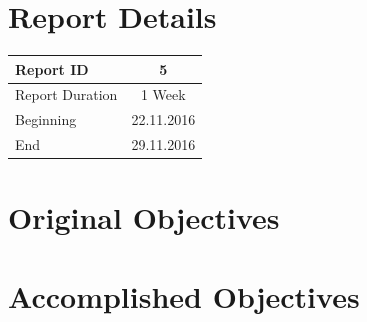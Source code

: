 \documentclass[11.5pt, b5paper]{article}
\begin{document}
\title{\rmfamily\normalfont{}}

\author{{\small Automatic Mandible Segmentation Using VTK}}

\date{\footnotesize{\today}}

\maketitle

% 
 


\section{Report Details}
\begin{center}
\begin{tabular}{ l | c }
\hline 
Report ID & 5   \\ %
\hline 
Report Duration & 1 Week \\ %
\hline 
Beginning & 22.11.2016 \\ %
\hline 
End & 29.11.2016 \\ %
\hline 
\end{tabular}
\end{center}

\section{Original Objectives}

\section{Accomplished Objectives}
\end{document}
